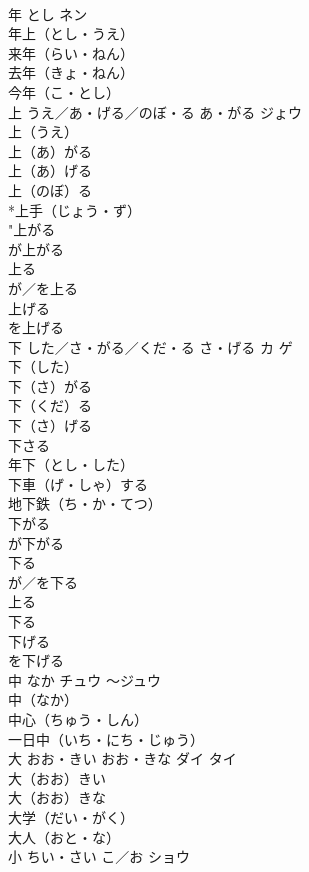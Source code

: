 \documentclass[8pt]{extreport}
\begin{document}
\begin{CJK}{UTF8}{min}
\\	年	とし	ネン	
\\	年上（とし・うえ）　
\\	来年（らい・ねん）　
\\	去年（きょ・ねん）　
\\	今年（こ・とし）　
\\	上	うえ／あ・げる／のぼ・る あ・がる	ジょウ	
\\	上（うえ）　
\\	上（あ）がる　
\\	上（あ）げる　
\\	上（のぼ）る　
\\	*上手（じょう・ず）　
\\	"上がる　
\\	が上がる 
\\	上る　
\\	が／を上る 
\\	上げる　
\\	を上げる 
\\	下	した／さ・がる／くだ・る さ・げる	カ ゲ	
\\	下（した）　
\\	下（さ）がる　
\\	下（くだ）る　
\\	下（さ）げる　
\\	下さる　
\\	年下（とし・した）　
\\	下車（げ・しゃ）する　
\\	地下鉄（ち・か・てつ）　
\\	下がる　
\\	が下がる 
\\	下る　
\\	が／を下る 
\\	上る 
\\	下る 
\\	下げる　
\\	を下げる 
\\	中	なか	チュウ ～ジュウ	
\\	中（なか）　
\\	中心（ちゅう・しん）　
\\	一日中（いち・にち・じゅう）　
\\	大	おお・きい おお・きな	ダイ タイ	
\\	大（おお）きい　
\\	大（おお）きな　
\\	大学（だい・がく）　
\\	大人（おと・な）　
\\	小	ちい・さい こ／お	ショウ	

\end{CJK}
\end{document}
